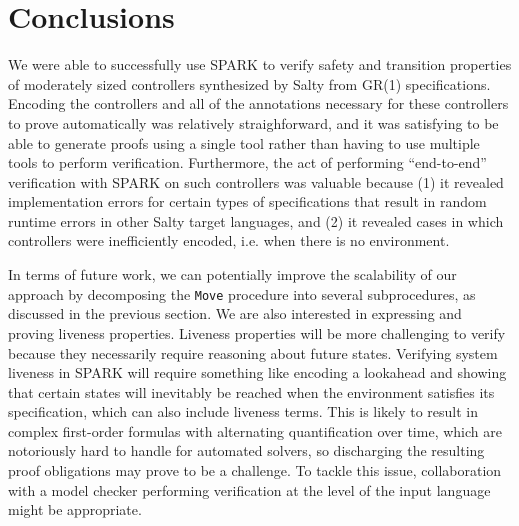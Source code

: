 \documentclass[runningheads]{llncs}
\begin{document}
\section{Conclusions}
\label{sec:conclusions}

We were able to successfully use SPARK to verify safety and transition properties of moderately sized controllers 
synthesized by Salty from GR(1) specifications. 
Encoding the controllers and all of the annotations necessary for these controllers to prove automatically was relatively straighforward, 
and it was satisfying to be able to generate proofs using a single tool rather than having to use multiple tools to perform verification.
Furthermore, the act of performing ``end-to-end'' verification with SPARK on such controllers was valuable because (1) it revealed implementation errors for certain 
types of specifications that result in random runtime errors in other Salty target languages, and (2) it revealed cases in which controllers were inefficiently encoded, i.e. when there is no environment.



In terms of future work, we can potentially improve the scalability of our approach by decomposing the \lstinline{Move} procedure 
into several subprocedures, as discussed in the previous section. 
We are also interested in expressing and proving liveness properties. 
Liveness properties will be more challenging to verify because they necessarily require reasoning about future states. 
Verifying system liveness in SPARK will require something like encoding a lookahead and showing that certain states will inevitably be reached 
when the environment satisfies its specification, which can also include liveness terms. 
This is likely to result in complex first-order formulas with alternating quantification over time, which are 
notoriously hard to handle for automated solvers, so discharging the resulting proof obligations may prove to be a challenge.
To tackle this issue, collaboration with a model checker performing verification at the level of the input language might be appropriate.

%
%
%
\newpage


\end{document}

